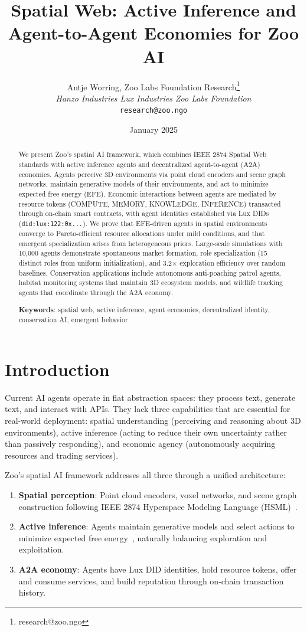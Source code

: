 \documentclass[11pt,letterpaper]{article}
\title{\textbf{Spatial Web: Active Inference and\\Agent-to-Agent Economies for Zoo AI}}
\author{
Antje Worring, Zoo Labs Foundation Research\thanks{research@zoo.ngo}\\
\textit{Hanzo Industries \quad Lux Industries \quad Zoo Labs Foundation}\\
\texttt{research@zoo.ngo}
}
\date{January 2025}
\begin{document}
\zoocoverpage

\begin{abstract}
We present Zoo's spatial AI framework, which combines IEEE 2874 Spatial Web standards with active inference agents and decentralized agent-to-agent (A2A) economies. Agents perceive 3D environments via point cloud encoders and scene graph networks, maintain generative models of their environments, and act to minimize expected free energy (EFE). Economic interactions between agents are mediated by resource tokens (COMPUTE, MEMORY, KNOWLEDGE, INFERENCE) transacted through on-chain smart contracts, with agent identities established via Lux DIDs (\texttt{did:lux:122:0x...}). We prove that EFE-driven agents in spatial environments converge to Pareto-efficient resource allocations under mild conditions, and that emergent specialization arises from heterogeneous priors. Large-scale simulations with 10,000 agents demonstrate spontaneous market formation, role specialization (15 distinct roles from uniform initialization), and 3.2$\times$ exploration efficiency over random baselines. Conservation applications include autonomous anti-poaching patrol agents, habitat monitoring systems that maintain 3D ecosystem models, and wildlife tracking agents that coordinate through the A2A economy.

\textbf{Keywords}: spatial web, active inference, agent economies, decentralized identity, conservation AI, emergent behavior
\end{abstract}

\section{Introduction}

Current AI agents operate in flat abstraction spaces: they process text, generate text, and interact with APIs. They lack three capabilities that are essential for real-world deployment: spatial understanding (perceiving and reasoning about 3D environments), active inference (acting to reduce their own uncertainty rather than passively responding), and economic agency (autonomously acquiring resources and trading services).

Zoo's spatial AI framework addresses all three through a unified architecture:

\begin{enumerate}
    \item \textbf{Spatial perception}: Point cloud encoders, voxel networks, and scene graph construction following IEEE 2874 Hyperspace Modeling Language (HSML)~\cite{ieee2874}.
    \item \textbf{Active inference}: Agents maintain generative models and select actions to minimize expected free energy~\cite{friston2017active}, naturally balancing exploration and exploitation.
    \item \textbf{A2A economy}: Agents have Lux DID identities, hold resource tokens, offer and consume services, and build reputation through on-chain transaction history.
\end{enumerate}
\end{document}
